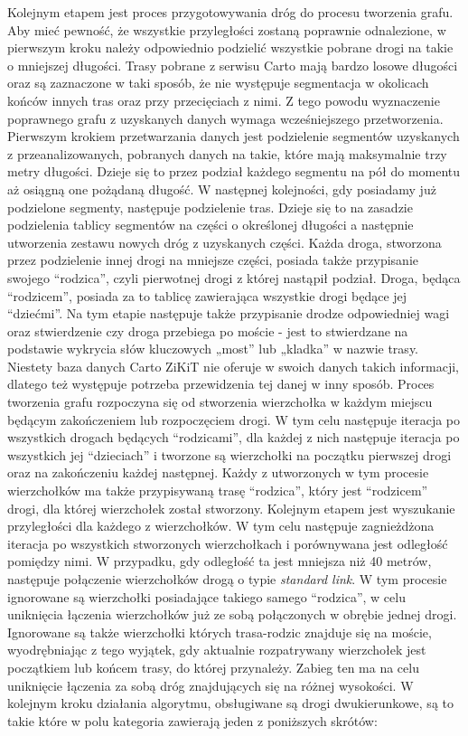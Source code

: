 Kolejnym etapem jest proces przygotowywania dróg do procesu tworzenia grafu. Aby mieć pewność, że wszystkie przyległości zostaną poprawnie odnalezione, w pierwszym kroku należy odpowiednio podzielić wszystkie pobrane drogi na takie o mniejszej długości. Trasy pobrane z serwisu Carto mają bardzo losowe długości oraz są zaznaczone w taki sposób, że nie występuje segmentacja w okolicach końców innych tras oraz przy przecięciach z nimi. Z tego powodu wyznaczenie poprawnego grafu z uzyskanych danych wymaga wcześniejszego przetworzenia. Pierwszym krokiem przetwarzania danych jest podzielenie segmentów uzyskanych z przeanalizowanych, pobranych danych na takie, które mają maksymalnie trzy metry długości. Dzieje się to przez podział każdego segmentu na pół do momentu aż osiągną one pożądaną długość. W następnej kolejności, gdy posiadamy już podzielone segmenty, następuje podzielenie tras. Dzieje się to na zasadzie podzielenia tablicy segmentów na części o określonej długości a następnie utworzenia zestawu nowych dróg z uzyskanych części. Każda droga, stworzona przez podzielenie innej drogi na mniejsze części, posiada także przypisanie swojego ``rodzica'', czyli pierwotnej drogi z której nastąpił podział. Droga, będąca ``rodzicem'', posiada za to tablicę zawierająca wszystkie drogi będące jej ``dziećmi''. Na tym etapie następuje także przypisanie drodze odpowiedniej wagi oraz stwierdzenie czy droga przebiega po moście - jest to stwierdzane na podstawie wykrycia słów kluczowych „most” lub „kladka” w nazwie trasy. Niestety baza danych Carto ZiKiT nie oferuje w swoich danych takich informacji, dlatego też występuje potrzeba przewidzenia tej danej w inny sposób. \newline
Proces tworzenia grafu rozpoczyna się od stworzenia wierzchołka w każdym miejscu będącym zakończeniem lub rozpoczęciem drogi. W tym celu następuje iteracja po wszystkich drogach będących ``rodzicami'', dla każdej z nich następuje iteracja po wszystkich jej ``dzieciach'' i tworzone są wierzchołki na początku pierwszej drogi oraz na zakończeniu każdej następnej. Każdy z utworzonych w tym procesie wierzchołków ma także przypisywaną trasę ``rodzica'', który jest ``rodzicem'' drogi, dla której wierzchołek został stworzony. Kolejnym etapem jest wyszukanie przyległości dla każdego z wierzchołków. W tym celu następuje zagnieżdżona iteracja po wszystkich stworzonych wierzchołkach i porównywana jest odległość pomiędzy nimi. W przypadku, gdy odległość ta jest mniejsza niż 40 metrów, następuje połączenie wierzchołków drogą o typie \textit{standard link}. W tym procesie ignorowane są wierzchołki posiadające takiego samego ``rodzica'', w celu uniknięcia łączenia wierzchołków już ze sobą połączonych w obrębie jednej drogi. Ignorowane są także wierzchołki których trasa-rodzic znajduje się na moście, wyodrębniając z tego wyjątek, gdy aktualnie rozpatrywany wierzchołek jest początkiem lub końcem trasy, do której przynależy. Zabieg ten ma na celu uniknięcie łączenia za sobą dróg znajdujących się na różnej wysokości.
W kolejnym kroku działania algorytmu, obsługiwane są drogi dwukierunkowe, są to takie które w polu kategoria zawierają jeden z poniższych skrótów:

